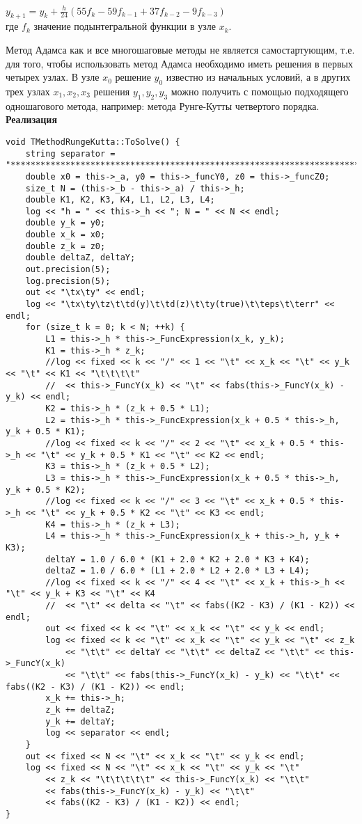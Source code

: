 $y_{k+1}=y_k+\frac{h}{24}(55f_k-59f_{k-1}+37f_{k-2}-9f_{k-3})$\\

где $f_k$ значение подынтегральной функции в узле $x_k$.

Метод Адамса как и все многошаговые методы не является самостартующим, т.е. для того, чтобы использовать метод Адамса необходимо иметь решения в первых четырех узлах. В узле $x_0$ решение $y_0$ известно из начальных условий, а в других трех узлах $x_1, x_2, x_3$ решения $y_1, y_2, y_3$ можно получить с помощью подходящего одношагового метода, например: метода Рунге-Кутты четвертого порядка.\\

\textbf{Реализация}\\

\begin{lstlisting}
void TMethodRungeKutta::ToSolve() {
	string separator = "*************************************************************************************************";
	double x0 = this->_a, y0 = this->_funcY0, z0 = this->_funcZ0;
	size_t N = (this->_b - this->_a) / this->_h;
	double K1, K2, K3, K4, L1, L2, L3, L4;
	log << "h = " << this->_h << "; N = " << N << endl;
	double y_k = y0;
	double x_k = x0;
	double z_k = z0;
	double deltaZ, deltaY;
	out.precision(5);
	log.precision(5);
	out << "\tx\ty" << endl;
	log << "\tx\ty\tz\t\td(y)\t\td(z)\t\ty(true)\t\teps\t\terr" << endl;
	for (size_t k = 0; k < N; ++k) {
		L1 = this->_h * this->_FuncExpression(x_k, y_k);
		K1 = this->_h * z_k;		
		//log << fixed << k << "/" << 1 << "\t" << x_k << "\t" << y_k << "\t" << K1 << "\t\t\t\t" 
		//	<< this->_FuncY(x_k) << "\t" << fabs(this->_FuncY(x_k) - y_k) << endl;		
		K2 = this->_h * (z_k + 0.5 * L1);
		L2 = this->_h * this->_FuncExpression(x_k + 0.5 * this->_h, y_k + 0.5 * K1);
		//log << fixed << k << "/" << 2 << "\t" << x_k + 0.5 * this->_h << "\t" << y_k + 0.5 * K1 << "\t" << K2 << endl;
		K3 = this->_h * (z_k + 0.5 * L2);
		L3 = this->_h * this->_FuncExpression(x_k + 0.5 * this->_h, y_k + 0.5 * K2);
		//log << fixed << k << "/" << 3 << "\t" << x_k + 0.5 * this->_h << "\t" << y_k + 0.5 * K2 << "\t" << K3 << endl;
		K4 = this->_h * (z_k + L3);
		L4 = this->_h * this->_FuncExpression(x_k + this->_h, y_k + K3);
		deltaY = 1.0 / 6.0 * (K1 + 2.0 * K2 + 2.0 * K3 + K4);
		deltaZ = 1.0 / 6.0 * (L1 + 2.0 * L2 + 2.0 * L3 + L4);
		//log << fixed << k << "/" << 4 << "\t" << x_k + this->_h << "\t" << y_k + K3 << "\t" << K4 
		//	<< "\t" << delta << "\t" << fabs((K2 - K3) / (K1 - K2)) << endl;
		out << fixed << k << "\t" << x_k << "\t" << y_k << endl;
		log << fixed << k << "\t" << x_k << "\t" << y_k << "\t" << z_k 
			<< "\t\t" << deltaY << "\t\t" << deltaZ << "\t\t" << this->_FuncY(x_k) 
			<< "\t\t" << fabs(this->_FuncY(x_k) - y_k) << "\t\t" << fabs((K2 - K3) / (K1 - K2)) << endl;
		x_k += this->_h;
		z_k += deltaZ;
		y_k += deltaY;		
		log << separator << endl;
	}	
	out << fixed << N << "\t" << x_k << "\t" << y_k << endl;
	log << fixed << N << "\t" << x_k << "\t" << y_k << "\t" 
		<< z_k << "\t\t\t\t\t" << this->_FuncY(x_k) << "\t\t" 
		<< fabs(this->_FuncY(x_k) - y_k) << "\t\t" 
		<< fabs((K2 - K3) / (K1 - K2)) << endl;
}


\end{lstlisting}
